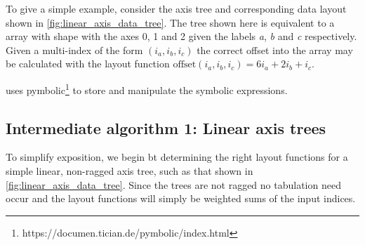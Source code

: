 \documentclass[thesis]{subfiles}
\begin{document}
To give a simple example, consider the axis tree and corresponding data layout shown in \cref{fig:linear_axis_data_tree}.
The tree shown here is equivalent to a \numpy array with shape  with the \numpy axes 0, 1 and 2 given the labels \textit{a}, \textit{b} and \textit{c} respectively.
Given a multi-index of the form $(i_a, i_b, i_c)$ the correct offset into the array may be calculated with the layout function $\textrm{offset}(i_a, i_b, i_c) = 6 i_a + 2 i_b + i_c$.

 uses pymbolic\footnote{https://documen.tician.de/pymbolic/index.html} to store and manipulate the symbolic expressions.


%
%

\subsection{Intermediate algorithm 1: Linear axis trees}

To simplify exposition, we begin bt determining the right layout functions for a simple linear, non-ragged axis tree, such as that shown in \cref{fig:linear_axis_data_tree}.
Since the trees are not ragged no tabulation need occur and the layout functions will simply be weighted sums of the input indices.
\end{document}
